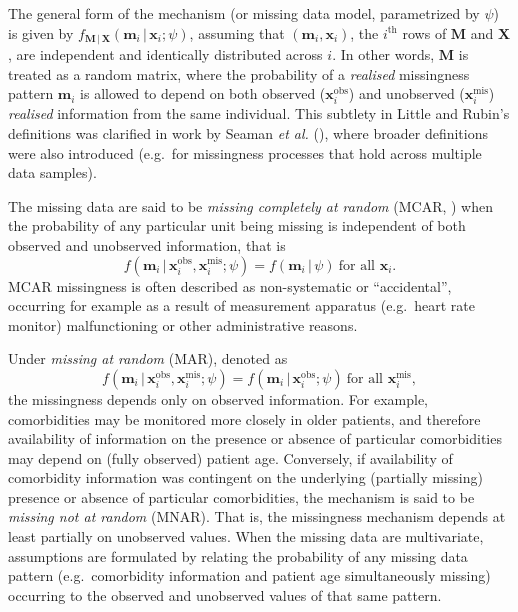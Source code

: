 \documentclass[
  letterpaper,
  DIV=11,
  numbers=noendperiod]{scrreprt}
\newcommand{\given}{\,|\,}
\begin{document}
The general form of the mechanism (or missing data model, parametrized
by \(\psi\)) is given by
\(f_{\mathbf{M} \given \mathbf{X}}(\mathbf{m}_i \given \mathbf{x}_i;\psi)\),
assuming that \((\mathbf{m}_i,\mathbf{x}_i)\), the \(i^{\text{th}}\)
rows of \(\mathbf{M}\) and \(\mathbf{X}\), are independent and
identically distributed across \(i\). In other words, \(\mathbf{M}\) is
treated as a random matrix, where the probability of a \emph{realised}
missingness pattern \(\mathbf{m}_i\) is allowed to depend on both
observed (\(\mathbf{x}_i^{\text{obs}}\)) and unobserved
(\(\mathbf{x}_i^{\text{mis}}\)) \emph{realised} information from the
same individual. This subtlety in Little and Rubin's definitions was
clarified in work by Seaman \emph{et al.}
(), where broader
definitions were also introduced (e.g.~for missingness processes that
hold across multiple data samples).

The missing data are said to be \emph{missing completely at random}
(MCAR, ) when the probability of any particular unit being
missing is independent of both observed and unobserved information, that
is \[
f(\mathbf{m}_i \given \mathbf{x}_i^{\text{obs}},\mathbf{x}_i^{\text{mis}};\psi) = f(\mathbf{m}_i \given \psi)  \ \text{for all } \mathbf{x}_i.
\] MCAR missingness is often described as non-systematic or
``accidental'', occurring for example as a result of measurement
apparatus (e.g.~heart rate monitor) malfunctioning or other
administrative reasons.

Under \emph{missing at random} (MAR), denoted as \[
f(\mathbf{m}_i \given \mathbf{x}_i^{\text{obs}},\mathbf{x}_i^{\text{mis}};\psi) = f(\mathbf{m}_i \given \mathbf{x}_i^{\text{obs}}; \psi) \ \text{for all } \mathbf{x}_i^{\text{mis}},
\] the missingness depends only on observed information. For example,
comorbidities may be monitored more closely in older patients, and
therefore availability of information on the presence or absence of
particular comorbidities may depend on (fully observed) patient age.
Conversely, if availability of comorbidity information was contingent on
the underlying (partially missing) presence or absence of particular
comorbidities, the mechanism is said to be \emph{missing not at random}
(MNAR). That is, the missingness mechanism depends at least partially on
unobserved values. When the missing data are multivariate, assumptions
are formulated by relating the probability of any missing data pattern
(e.g.~comorbidity information and patient age simultaneously missing)
occurring to the observed and unobserved values of that same pattern.
\end{document}
